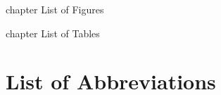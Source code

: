 \documentclass[12pt,a4paper]{report}                      %
\begin{document}
\frontmatter



% 

\contentsandlists
\newpage
{} {chapter} {List of Figures}
\newpage
{} {chapter} {List of Tables}
\newpage
\chapter*{List of Abbreviations}

\mainmatter




\backmatter


\appendix




\end{document}
